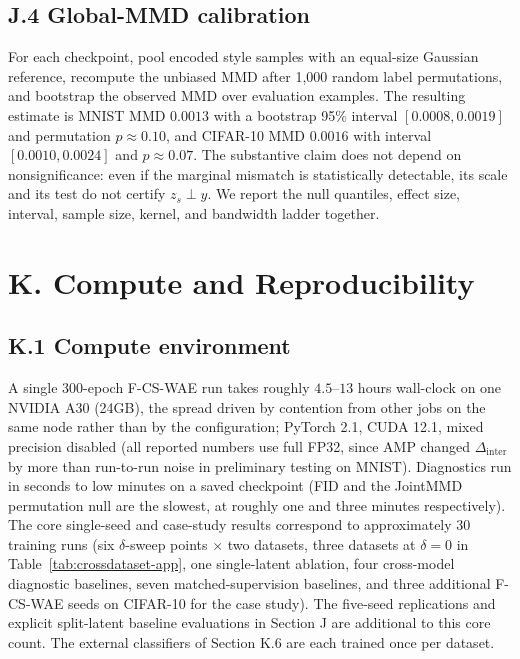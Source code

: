 \documentclass[letterpaper]{article}
\newcommand{\ours}{F-CS-WAE}
\newcommand{\Dinter}{\Delta_{\mathrm{inter}}}
\begin{document}
\subsection{J.4 Global-MMD calibration}

For each checkpoint, pool encoded style samples with an equal-size
Gaussian reference, recompute the unbiased MMD after 1,000 random label
permutations, and bootstrap the observed MMD over evaluation examples. The
resulting estimate is MNIST MMD $0.0013$ with a bootstrap 95\% interval
$[0.0008,0.0019]$ and permutation $p\approx0.10$, and CIFAR-10 MMD $0.0016$
with interval $[0.0010,0.0024]$ and $p\approx0.07$. The substantive claim does
not depend on nonsignificance: even if
the marginal mismatch is statistically detectable, its scale and its test do
not certify $z_s\perp y$. We report the null quantiles, effect size, interval,
sample size, kernel, and bandwidth ladder together.

\section{K. Compute and Reproducibility}

\subsection{K.1 Compute environment}

A single 300-epoch \ours{} run takes roughly $4.5$--$13$ hours wall-clock on
one NVIDIA A30 (24GB), the spread driven by contention from other jobs on the
same node rather than by the configuration; PyTorch 2.1, CUDA 12.1, mixed
precision disabled (all reported numbers use full FP32, since AMP changed
$\Dinter$ by more than run-to-run noise in preliminary testing on MNIST).
Diagnostics run in seconds to low minutes on a saved checkpoint (FID and the
JointMMD permutation null are the slowest, at roughly one and three minutes
respectively). The core single-seed and case-study results correspond to
approximately $30$ training runs (six
$\delta$-sweep points $\times$ two datasets, three datasets at $\delta{=}0$
in Table~\ref{tab:crossdataset-app}, one single-latent ablation, four
cross-model diagnostic baselines, seven matched-supervision baselines, and
three additional \ours{} seeds on CIFAR-10 for the case study). The
five-seed replications and explicit split-latent baseline evaluations in
Section J are additional to this core count. The external classifiers of
Section K.6 are each trained once per dataset.
\end{document}
